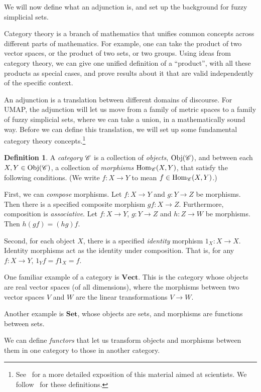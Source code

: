 \documentclass[a4paper,11pt,leqno]{article} \usepackage{amsmath}
\newcommand{\Hom}{\ensuremath{\operatorname{Hom}}}
\newcommand{\Obj}{\ensuremath{\operatorname{Obj}}}
\theoremstyle{definition}
\newtheorem{defn}{Definition}
\begin{document}
We will now define what an adjunction is, and set up the background for fuzzy
simplicial sets.

Category theory is a branch of mathematics that unifies common concepts across
different parts of mathematics.
For example, one can take the product of two vector spaces, or the product of
two sets, or two groups.
Using ideas from category theory, we can give one unified definition of a
``product'', with all these products as special cases, and prove results about
it that are valid independently of the specific context.

An adjunction is a translation between different domains of discourse.
For UMAP, the adjunction will let us move from a family of metric spaces to
a family of fuzzy simplicial sets, where we can take a union, in
a mathematically sound way.
Before we can define this translation, we will set up some fundamental category
theory concepts.\footnote{
  See~\cite{Spivak18} for a more detailed exposition of this material aimed at
  scientists.  We follow~\cite{Riehl} for these definitions.
}

\begin{defn}
  A \emph{category} $\mathscr{C}$ is a collection of \emph{objects}, $\Obj(\curC)$,
  and between each $X, Y\in\Obj(\curC)$, a collection of \emph{morphisms}
  $\Hom_{\curC}(X, Y)$, that satisfy the following conditions.
  (We write $f: X\to Y$ to mean $f\in \Hom_{\curC}(X, Y)$.)

  First, we can \emph{compose} morphisms.
  Let $f: X\to Y$ and $g: Y\to Z$ be morphisms.
  Then there is a specified composite morphism $gf: X\to Z$.
  Furthermore, composition is \emph{associative}.
  Let $f: X\to Y$, $g: Y\to Z$ and $h: Z\to W$ be morphisms.
  Then $h(gf) = (hg)f$.

  Second, for each object $X$, there is a specified \emph{identity} morphism
  $1_X: X\to X$.
  Identity morphisms act as the identity under composition.
  That is, for any $f: X\to Y$, $1_Yf = f1_X = f$.
\end{defn}

One familiar example of a category is $\textbf{Vect}$.
This is the category whose objects are real vector spaces (of all dimensions),
where the morphisms between two vector spaces $V$ and $W$ are the linear
transformations $V\to W$.

Another example is $\textbf{Set}$, whose objects are sets, and morphisms are
functions between sets.

We can define \emph{functors} that let us transform objects and morphisms between them in
one category to those in another category.
\end{document}
